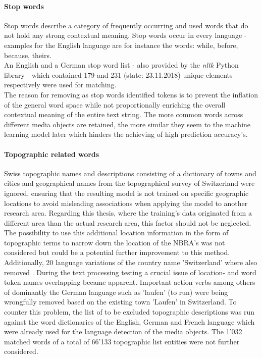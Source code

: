 \paragraph*{Stop words}
Stop words describe a category of frequently occurring and used words that do not hold any strong contextual meaning. Stop words occur in every language - examples for the English language are for instance the words: while, before, because, theirs.\\
An English and a German stop word list - also provided by the \textit{nltk} Python library - which contained 179 and 231 (state: 23.11.2018) unique elements respectively were used for matching.\\
\newline
The reason for removing as stop words identified tokens is to prevent the inflation of the general word space while not proportionally enriching the overall contextual meaning of the entire text string. The more common words across different media objects are retained, the more similar they seem to the machine learning model later which hinders the achieving of high prediction accuracy's.

\paragraph*{Topographic related words}
Swiss topographic names and descriptions consisting of a dictionary of towns and cities \parencite{Swisstopo2018O} and geographical names from the topographical survey of Switzerland \parencite{Swisstopo2018a} were ignored, ensuring that the resulting model is not trained on  specific geographic locations to avoid misleading associations when applying the model to another research area. Regarding this thesis, where the training's data originated from a different area than the actual research area, this factor should not be neglected. 
The possibility to use this additional location information in the form of topographic terms to narrow down the location of the NBRA's was not considered but could be a potential further improvement to this method. 
Additionally, 20 language variations of the country name 'Switzerland' where also removed \parencite{101languages2018}. 
During the text processing testing a crucial issue of location- and word token names overlapping became apparent. Important action verbs among others of dominantly the German language such as 'laufen' (to run) were being wrongfully removed based on the existing town 'Laufen' in Switzerland. To counter this problem, the list of to be excluded topographic descriptions was run against the word dictionaries of the English, German and French language which were already used for the language detection of the media objects. The 1'032 matched words of a total of 66'133 topographic list entities were not further considered.

